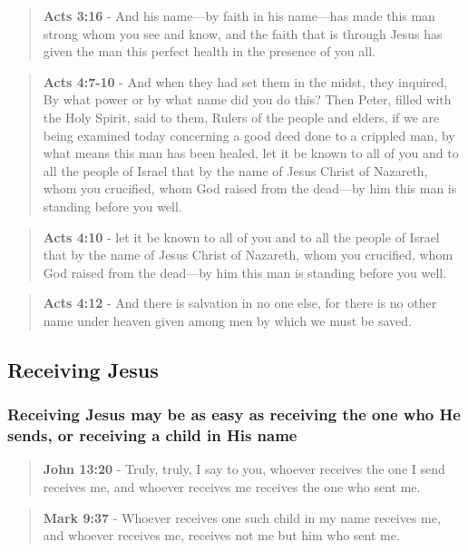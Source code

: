 \documentclass[11pt]{article}
\begin{document}
\begin{quote}
\textbf{Acts 3:16} - And his name—by faith in his name—has made this man strong whom you see and know, and the faith that is through Jesus has given the man this perfect health in the presence of you all.
\end{quote}

\begin{quote}
\textbf{Acts 4:7-10} - And when they had set them in the midst, they inquired, By what power or by what name did you do this? Then Peter, filled with the Holy Spirit, said to them, Rulers of the people and elders, if we are being examined today concerning a good deed done to a crippled man, by what means this man has been healed, let it be known to all of you and to all the people of Israel that by the name of Jesus Christ of Nazareth, whom you crucified, whom God raised from the dead—by him this man is standing before you well.
\end{quote}

\begin{quote}
\textbf{Acts 4:10} - let it be known to all of you and to all the people of Israel that by the name of Jesus Christ of Nazareth, whom you crucified, whom God raised from the dead—by him this man is standing before you well.
\end{quote}

\begin{quote}
\textbf{Acts 4:12} - And there is salvation in no one else, for there is no other name under heaven given among men by which we must be saved.
\end{quote}

\subsection{Receiving Jesus}
\label{sec:orgcba27d3}

\subsubsection{Receiving Jesus may be as easy as receiving the one who He sends, or receiving a child in His name}
\label{sec:orgae87abe}

\begin{quote}
\textbf{John 13:20} - Truly, truly, I say to you, whoever receives the one I send receives me, and whoever receives me receives the one who sent me.
\end{quote}

\begin{quote}
\textbf{Mark 9:37} - Whoever receives one such child in my name receives me, and whoever receives me, receives not me but him who sent me.
\end{quote}
\end{document}
